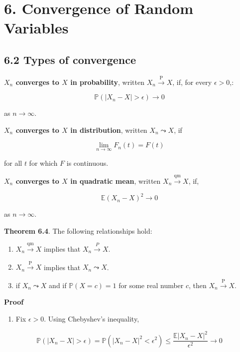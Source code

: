\section{6. Convergence of Random Variables}\label{convergence-of-random-variables}

\subsection{6.2 Types of convergence}\label{types-of-convergence}

\textbf{\(X_n\) converges to \(X\) in probability}, written
\(X_n \xrightarrow{\text{P}} X\), if, for every \(\epsilon > 0\),:

\[ \mathbb{P}( |X_n - X| > \epsilon ) \rightarrow 0 \]

as \(n \rightarrow \infty\).

\textbf{\(X_n\) converges to \(X\) in distribution}, written
\(X_n \leadsto X\), if

\[ \lim _{n \rightarrow \infty} F_n(t) = F(t) \]

for all \(t\) for which \(F\) is continuous.

\textbf{\(X_n\) converges to \(X\) in quadratic mean}, written
\(X_n \xrightarrow{\text{qm}} X\), if,

\[ \mathbb{E}(X_n - X)^2 \rightarrow 0 \]

as \(n \rightarrow \infty\).

\textbf{Theorem 6.4}. The following relationships hold:

\begin{enumerate}[label={\arabic*.}]
\item
  \(X_n \xrightarrow{\text{qm}} X\) implies that
  \(X_n \xrightarrow{P} X\).
\item
  \(X_n \xrightarrow{\text{P}} X\) implies that \(X_n \leadsto X\).
\item
  if \(X_n \leadsto X\) and if \(\mathbb{P}(X = c) = 1\) for some real
  number \(c\), then \(X_n \xrightarrow{\text{P}} X\).
\end{enumerate}

\textbf{Proof}

\begin{enumerate}[tightlist,label={\arabic*.}]
\item
  Fix \(\epsilon > 0\). Using Chebyshev's inequality,
\end{enumerate}

\[ \mathbb{P}(|X_n - X| > \epsilon) = \mathbb{P}(|X_n - X|^2 < \epsilon^2) \leq \frac{\mathbb{E}|X_n - X|^2}{\epsilon^2} \rightarrow 0 \]

